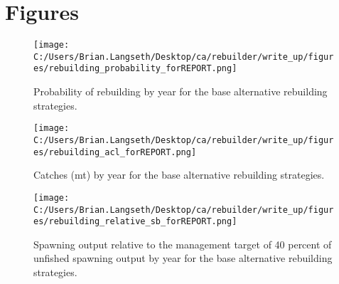 \documentclass[11pt,
  english,
  a4paper,
]{article}
\begin{document}
\clearpage

\clearpage


\hypertarget{figures}{%
\section{Figures}\label{figures}}

\leavevmode\tagmcend\tagstructend


\begin{figure}
\centering
\texttt{[image: C:/Users/Brian.Langseth/Desktop/ca/rebuilder/write\_up/figures/rebuilding\_probability\_forREPORT.png]}
\caption{Probability of rebuilding by year for the base alternative rebuilding strategies.\label{fig:prob-fig}}
\end{figure}

\tagmcend\tagstructend


\begin{figure}
\centering
\texttt{[image: C:/Users/Brian.Langseth/Desktop/ca/rebuilder/write\_up/figures/rebuilding\_acl\_forREPORT.png]}
\caption{Catches (mt) by year for the base alternative rebuilding strategies.\label{fig:acl-fig}}
\end{figure}

\tagmcend\tagstructend


\begin{figure}
\centering
\texttt{[image: C:/Users/Brian.Langseth/Desktop/ca/rebuilder/write\_up/figures/rebuilding\_relative\_sb\_forREPORT.png]}
\caption{Spawning output relative to the management target of 40 percent of unfished spawning output by year for the base alternative rebuilding strategies.\label{fig:rel-ssb-fig}}
\end{figure}

\tagmcend\tagstructend
\end{document}
